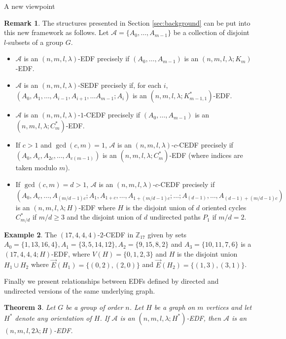\documentclass[12pt, a4paper]{article}
\newtheorem{theorem}{Theorem}[section]
\theoremstyle{definition}
\newtheorem{example}[theorem]{Example}
\newtheorem{remark}[theorem]{Remark}
\newcommand{\E}{\overrightarrow{E}}
\begin{document}
\begin{section}{A new viewpoint}
\begin{remark}
The structures presented in Section \ref{sec:background} can be put into this new framework as follows.
Let $\mathcal{A}=\{A_0,\ldots, A_{m-1}\}$ be a collection of disjoint $l$-subsets of a group $G$.
\begin{itemize}\label{main:EDFs}
\item $\mathcal{A}$ is an $(n,m,l,\lambda)$-EDF precisely if $(A_0,\ldots,A_{m-1})$ is an $(n,m,l,\lambda;K_m)$-EDF.
\item $\mathcal{A}$ is an $(n,m,l,\lambda)$-SEDF precisely if, for each $i$, $(A_0,A_1,\ldots, A_{i-1},A_{i+1},\ldots A_{m-1}; A_i)$ is an $(n,m,l,\lambda; K_{m-1,1}^*)$-EDF.
\item $\mathcal{A}$ is an $(n,m,l,\lambda)$-$1$-CEDF precisely if $(A_0,\ldots,A_{m-1})$ is an $(n,m,l,\lambda; C_m^*)$-EDF.
\item If $c>1$ and $\gcd(c,m)=1$, $\mathcal{A}$ is an $(n,m,l,\lambda)$-$c$-CEDF precisely if $(A_0, A_c, A_{2c},\ldots,A_{c(m-1)})$ is an $(n,m,l,\lambda; C_m^*)$-EDF (where indices are taken modulo $m$).
\item If $\gcd(c,m)=d>1$, $\mathcal{A}$ is an $(n,m,l,\lambda)$-$c$-CEDF precisely if 
$$(A_0,A_{c}, \ldots, A_{(m/d-1)c}; A_1, A_{1+c}, \ldots, A_{1+(m/d-1)c}; \ldots; A_{(d-1)}, \ldots, A_{(d-1)+(m/d-1)c})$$ 
is an $(n,m,l,\lambda; H)$-EDF where $H$ is the disjoint union of $d$ oriented cycles $C_{m/d}^*$ if $m/d \geq 3$ and the disjoint union of $d$ undirected paths $P_1$ if $m/d=2$.
\end{itemize}
\end{remark}


\begin{example}
The $(17,4,4,4)$-$2$-CEDF in $\mathbb{Z}_{17}$ given by sets $A_0=\{1,13,16, 4\}, A_1=\{3,5,14,12\}, A_2=\{9,15,8,2\}$ and $A_3=\{10,11,7,6\}$ is a $(17,4,4,4; H)$-EDF, where $V(H)=\{0,1,2,3\}$ and $H$ is the disjoint union $H_1 \cup H_2$ where $\E(H_1)=\{(0,2), (2,0)\}$ and $\E(H_2)=\{(1,3), (3,1)\}$.
\end{example}
\end{section}

Finally we present relationships between EDFs defined by directed and undirected versions of the same underlying graph.


\begin{theorem}\label{general:dir_to_undir}
Let $G$ be a group of order $n$.  Let $H$ be a graph on $m$ vertices and let $H^*$ denote any orientation of $H$.
If $\mathcal{A}$ is an $(n,m,l,\lambda;H^*)$-EDF, then $\mathcal{A}$ is an $(n,m,l,2\lambda;H)$-EDF.
\end{theorem}
\end{document}
